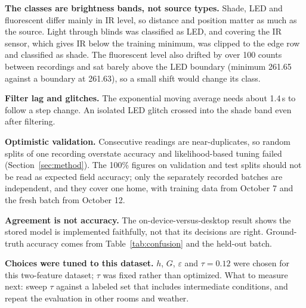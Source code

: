 \documentclass[conference]{IEEEtran}
\begin{document}
\textbf{The classes are brightness bands, not source types.} Shade, LED and fluorescent differ mainly in IR level, so distance and position matter as much as the source. Light through blinds was classified as LED, and covering the IR sensor, which gives IR below the training minimum, was clipped to the edge row and classified as shade. The fluorescent level also drifted by over 100 counts between recordings and sat barely above the LED boundary (minimum 261.65 against a boundary at 261.63), so a small shift would change its class.



\textbf{Filter lag and glitches.} The exponential moving average needs about 1.4\,s to follow a step change. An isolated LED glitch crossed into the shade band even after filtering.

\textbf{Optimistic validation.} Consecutive readings are near-duplicates, so random splits of one recording overstate accuracy and likelihood-based tuning failed (Section~\ref{sec:method}). The 100\% figures on validation and test splits should not be read as expected field accuracy; only the separately recorded batches are independent, and they cover one home, with training data from October 7 and the fresh batch from October 12.



\textbf{Agreement is not accuracy.} The on-device-versus-desktop result shows the stored model is implemented faithfully, not that its decisions are right. Ground-truth accuracy comes from Table~\ref{tab:confusion} and the held-out batch.

\textbf{Choices were tuned to this dataset.} $h$, $G$, $\varepsilon$ and $\tau = 0.12$ were chosen for this two-feature dataset; $\tau$ was fixed rather than optimized. What to measure next: sweep $\tau$ against a labeled set that includes intermediate conditions, and repeat the evaluation in other rooms and weather.
\end{document}
